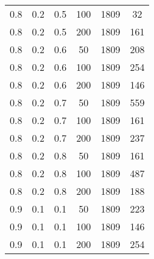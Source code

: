 \begin{table}[h]
\begin{center}
\begin{tabular}{|c|c|c|c|c|c|}
		0.8 &  0.2 &  0.5 &  100 &  1809 &    32 \\
		0.8 &  0.2 &  0.5 &  200 &  1809 &   161 \\
	   \hline
		0.8 &  0.2 &  0.6 &   50 &  1809 &   208 \\
		0.8 &  0.2 &  0.6 &  100 &  1809 &   254 \\
		0.8 &  0.2 &  0.6 &  200 &  1809 &   146 \\
	   \hline
		0.8 &  0.2 &  0.7 &   50 &  1809 &   559 \\
		0.8 &  0.2 &  0.7 &  100 &  1809 &   161 \\
		0.8 &  0.2 &  0.7 &  200 &  1809 &   237 \\
	   \hline
		0.8 &  0.2 &  0.8 &   50 &  1809 &   161 \\
		0.8 &  0.2 &  0.8 &  100 &  1809 &   487 \\
		0.8 &  0.2 &  0.8 &  200 &  1809 &   188 \\
	   \hline
		0.9 &  0.1 &  0.1 &   50 &  1809 &   223 \\
		0.9 &  0.1 &  0.1 &  100 &  1809 &   146 \\
		0.9 &  0.1 &  0.1 &  200 &  1809 &   254 \\
	   \hline
        		\end{tabular}
	\end{center}
\end{table}

